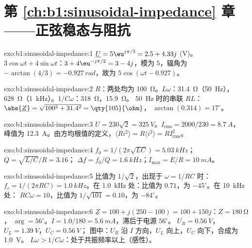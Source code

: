 \section*{第 \ref{ch:b1:sinusoidal-impedance} 章——正弦稳态与阻抗}

\begin{solution}{exo:b1:sinusoidal-impedance:1}
$\underline U = 5\eu^{j\pi/3} = 2.5 + 4.33j$ (V)。$3\cos\omega t +
4\sin\omega t$：$3 + 4\eu^{-j\pi/2} = 3 - 4j$，模为 $5$，辐角为
$-\arctan(4/3) = \qty{-0.927}{rad}$，故为 $5\cos(\omega t - 0.927)$。
\end{solution}

\begin{solution}{exo:b1:sinusoidal-impedance:2}
$R$：两处均为 \qty{100}{\ohm}。$L\omega$：\qty{31.4}{\ohm}（\qty{50}{Hz}），
\qty{628}{\ohm}（\qty{1}{kHz}）。$1/C\omega$：\qty{318}{\ohm}，\qty{15.9}{\ohm}。
\qty{50}{Hz} 时的串联 $RL$：$\abs{\underline Z} = \sqrt{100^2 + 31.4^2} =
\qty{105}{\ohm}$， $\arctan(0.314) = 17^\circ$。
\end{solution}

\begin{solution}{exo:b1:sinusoidal-impedance:3}
$U = 230\sqrt2 = \qty{325}{V}$。$I_{\mathrm{rms}} = 2000/230 = \qty{8.7}{A}$，
峰值为 \qty{12.3}{A}。由方均根值的定义，$\langle Ri^2\rangle = R\langle i^2\rangle =
RI_{\mathrm{rms}}^2$。
\end{solution}

\begin{solution}{exo:b1:sinusoidal-impedance:4}
$f_0 = 1/(2\pi\sqrt{LC}) = \qty{5.03}{kHz}$；$Q = \sqrt{L/C}/R = 3.16$；
$\Delta f = f_0/Q = \qty{1.6}{kHz}$；$I_{\max} = E/R = \qty{10}{mA}$。
\end{solution}

\begin{solution}{exo:b1:sinusoidal-impedance:5}
比值为 $1/\sqrt2$，出现于 $\omega = 1/RC$ 时：$f_c = 1/(2\pi RC) = \qty{1.0}{kHz}$。在
\qty{1.0}{kHz} 处：比值为 $0.71$，为 $-45^\circ$。在 \qty{10}{kHz} 处：
$RC\omega = 10$，比值为 $1/\sqrt{101} = 0.10$，为 $-84^\circ$。
\end{solution}

\begin{solution}{exo:b1:sinusoidal-impedance:6}
$\underline Z = 100 + j(250 - 100) = 100 + 150j$：$Z = \qty{180}{\ohm}$，
$\arg = 56^\circ$。$I = 1.0/180 = \qty{5.6}{mA}$，滞后于电源 $56^\circ$。
$U_R = \qty{0.56}{V}$，$U_L = \qty{1.39}{V}$，$U_C = \qty{0.56}{V}$；
图中：$U_R$ 沿 $I$ 方向，$U_L$ 向上，$U_C$ 向下，合成为 \qty{1.0}{V}。
$L\omega > 1/C\omega$：处于共振频率以上（感性）。
\end{solution}

